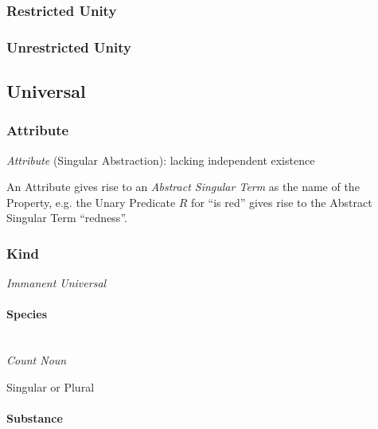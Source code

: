 \subsubsection{Restricted Unity}\label{sec:restricted_unity}

\subsubsection{Unrestricted Unity}\label{sec:unrestricted_unity}



\subsection{Universal}\label{sec:universal}

\subsubsection{Attribute}\label{sec:attribute}

\emph{Attribute} (Singular Abstraction): lacking independent existence

An Attribute gives rise to an \emph{Abstract Singular Term} as the name
of the Property, e.g. the Unary Predicate $R$ for ``is red'' gives
rise to the Abstract Singular Term ``redness''. \cite{laycock10}



\subsubsection{Kind}\label{sec:universal_kind}

\emph{Immanent Universal}



\paragraph{Species}\label{sec:species}
\hfill \\

\emph{Count Noun}

Singular or Plural



\paragraph{Substance}\label{sec:substance}
\hfill \\

